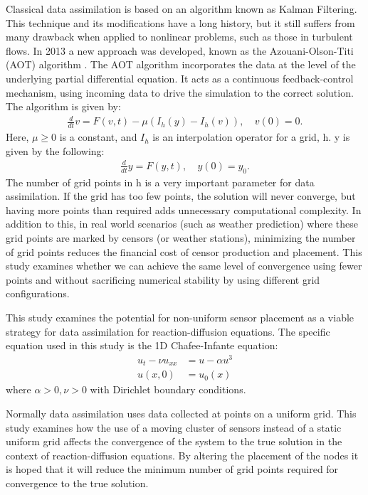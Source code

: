 \documentclass[12pt]{amsart}
\theoremstyle{plain}
\theoremstyle{definition}
\theoremstyle{remark}
\numberwithin{equation}{section} %
\numberwithin{figure}{section}   %
\begin{document}
Classical data assimilation is based on an algorithm known as Kalman Filtering. This technique and its modifications have a long history, but it still suffers from many drawback when applied to nonlinear problems, such as those in turbulent flows. In 2013 a new approach was developed, known as the Azouani-Olson-Titi (AOT) algorithm \cite{AOT1,AOT2}. The AOT algorithm incorporates the data at the level of the underlying partial differential equation. It acts as a continuous feedback-control mechanism, using incoming data to drive the simulation to the correct solution. The algorithm is given by:
\begin{align*}
\frac{d}{dt}v = F(v,t) - \mu(I_h(y)-I_h(v)), &~v(0) = 0.
\end{align*}
Here, $\mu \geq 0$ is a constant, and $I_h$ is an interpolation operator for a grid, h. y is given by the following:
\begin{align*}
\frac{d}{dt}y = F(y,t),& ~y(0) = y_0.
\end{align*}
The number of grid points in h is a very important parameter for data assimilation. If the grid has too few points, the solution will never converge, but having more points than required adds unnecessary computational complexity. In addition to this, in real world scenarios (such as weather prediction) where these grid points are marked by censors (or weather stations), minimizing the number of grid points reduces the financial cost of censor production and placement. This study examines whether we can achieve the same level of convergence using fewer points and without sacrificing numerical stability by using different grid configurations.

This study examines the potential for non-uniform sensor placement as a viable strategy for data assimilation for reaction-diffusion equations. The specific equation used in this study is the 1D Chafee-Infante equation:
\begin{align*}
u_t - \nu u_{xx} &= u - \alpha u^3\\
u(x,0) &= u_0(x)
\end{align*}
where $\alpha>0, \nu>0$ with Dirichlet boundary conditions.

Normally data assimilation uses data collected at points on a uniform grid. This study examines how the use of a moving cluster of sensors instead of a static uniform grid affects the convergence of the system to the true solution in the context of reaction-diffusion equations. By altering the placement of the nodes it is hoped that it will reduce the minimum number of grid points required for convergence to the true solution.
\end{document}
